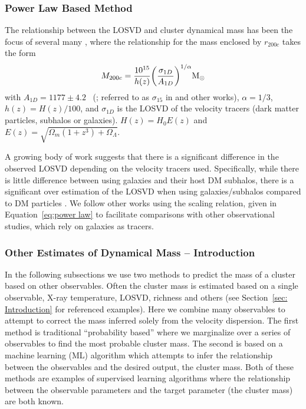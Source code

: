 \subsubsection{Power Law Based Method}
The relationship between the LOSVD and cluster dynamical mass has been the focus of several many , where the relationship for the mass enclosed by $r_{200c}$ takes the form
\begin{equation}\label{eq:power law}
	M_{200c} = \frac{10^{15}}{h(z)} \bigg{(}\frac{\sigma_{1D}}{A_{1D}} \bigg{)}^{1/\alpha} \hbox{$\mathrm{M}_\odot$}
\end{equation}
with $A_{1D} = 1177 \pm 4.2$ \kms\ (\citealt{Munari2013}; referred to as $\sigma_{15}$ in \citealt{Evrard2008} and other works), $\alpha = 1/3$, $h(z) = H(z)/100$, and $\sigma_{1D}$ is the LOSVD of the velocity tracers (dark matter particles, subhalos or galaxies). $H(z) = H_0 E(z)$ and $E(z) = \sqrt{\Omega_m(1+z^3)+\Omega_{\Lambda}}$.

A growing body of work suggests that there is a significant difference in the observed LOSVD depending on the velocity tracers used. Specifically, while there is little difference between using galaxies and their host DM subhalos, there is a significant over estimation of the LOSVD when using galaxies/subhalos compared to DM particles \citep{Munari2013}. We follow other works  using the scaling relation, given in Equation~\ref{eq:power law} to facilitate comparisons with other observational studies, which rely on galaxies as tracers. 

\subsubsection{Other Estimates of Dynamical Mass -- Introduction}
In the following subsections we use two methods to predict the mass of a cluster based on other observables. Often the cluster mass is estimated based on a single observable, X-ray temperature, LOSVD, richness and others (see Section~\ref{sec: Introduction} for referenced examples). Here we combine many observables to attempt to correct the mass inferred solely from the velocity dispersion. The first method is traditional ``probability based'' where we marginalize over a series of observables to find the most probable cluster mass. The second is based on a machine learning (ML) algorithm which attempts to infer the relationship between the observables and the desired output, the cluster mass. Both of these methods are examples of supervised learning algorithms where the relationship between the observable parameters and the target parameter (the cluster mass) are both known.

